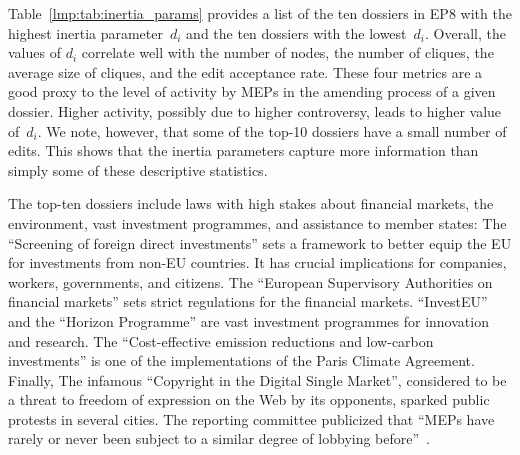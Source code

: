 Table~\ref{lmp:tab:inertia_params} provides a list of the ten dossiers in EP8 with the highest inertia parameter~$d_i$ and the ten dossiers with the lowest~$ d_i $.
Overall, the values of $d_i$ correlate well with the number of nodes, the number of cliques, the average size of cliques, and the edit acceptance rate.
These four metrics are a good proxy to the level of activity by MEPs in the amending process of a given dossier.
Higher activity, possibly due to higher controversy, leads to higher value of~$d_i$.
We note, however, that some of the top-10 dossiers have a small number of edits.
This shows that the inertia parameters capture more information than simply some of these descriptive statistics.

The top-ten dossiers include laws with high stakes about financial markets, the environment, vast investment programmes, and assistance to member states:
The ``Screening of foreign direct investments'' sets a framework to better equip the EU for investments from non-EU countries.
It has crucial implications for companies, workers, governments, and citizens.
The ``European Supervisory Authorities on financial markets'' sets strict regulations for the financial markets.
``InvestEU'' and the ``Horizon Programme'' are vast investment programmes for innovation and research.
The ``Cost-effective emission reductions and low-carbon investments'' is one of the implementations of the Paris Climate Agreement.
Finally, The infamous ``Copyright in the Digital Single Market'', considered to be a threat to freedom of expression on the Web by its opponents, sparked public protests in several cities.
The reporting committee publicized that ``MEPs have rarely or never been subject to a similar degree of lobbying before''~\citep{europarl2019questions}.


